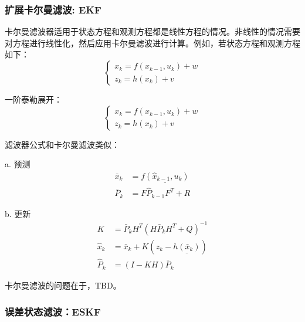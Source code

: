 \subsubsection{扩展卡尔曼滤波: EKF}
\par 卡尔曼滤波器适用于状态方程和观测方程都是线性方程的情况。非线性的情况需要对方程进行线性化，然后应用卡尔曼滤波进行计算。例如，若状态方程和观测方程如下：
\begin{equation}
	\left\{
	\begin{array}{lr}
		x_k = f(x_{k-1}, u_k) + w \\
		z_k = h(x_k) + v
	\end{array}
	\right.
\end{equation}
\par 一阶泰勒展开：
\begin{equation}
	\left\{
	\begin{array}{lr}
		x_k = f(x_{k-1}, u_k) + w \\
		z_k = h(x_k) + v
	\end{array}
	\right.
\end{equation}
\par 滤波器公式和卡尔曼滤波类似：
\par a. 预测
\begin{equation}
	\begin{split}
		\bar{x}_k&=\underline{f(\hat{x}_{k-1}, u_k)} \\
		\bar{P}_k&=F\hat{P}_{k-1}F^T+R
	\end{split}
\end{equation}
\par b. 更新
\begin{equation}
	\begin{split}
		K&=\bar{P}_k H^T(H \bar{P}_k H^T + Q)^{-1} \\
		\hat{x}_k&=\bar{x}_k+K(z_k-\underline{h(\bar{x}_k)}) \\
		\hat{P}_k&=(I-K H)\bar{P}_k
	\end{split}
\end{equation}
\par 卡尔曼滤波的问题在于，TBD。

\subsubsection{误差状态滤波：ESKF}
